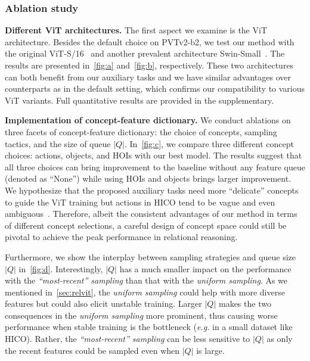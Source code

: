 \documentclass{article} \usepackage{iclr2022_conference,times}
\renewcommand{\paragraph}[1]{\noindent\textbf{#1.}}
\begin{document}
\vspace{-8pt}
\subsubsection{Ablation study}
\label{sec:exp_abl_rcl}
\vspace{-3pt}

\paragraph{Different ViT architectures}
The first aspect we examine is the ViT architecture. Besides the default choice on PVTv2-b2, we test our method with the original ViT-S/16~\citep{vit} and another prevalent architecture Swin-Small~\citep{liu2021swin}. The results are presented in~\autoref{fig:a} and~\autoref{fig:b}, respectively. These two architectures can both benefit from our auxiliary tasks and we have similar advantages over counterparts as in the default setting, which confirms our compatibility to various ViT variants. Full quantitative results are provided in the supplementary.

\paragraph{Implementation of concept-feature dictionary}
We conduct ablations on three facets of concept-feature dictionary: the choice of concepts, sampling tactics, and the size of queue $|Q|$. In~\autoref{fig:c}, we compare three different concept choices: actions, objects, and HOIs with our best model. The results suggest that all three choices can bring improvement to the baseline without any feature queue (denoted as ``None'') while using HOIs and objects brings larger improvement. We hypothesize that the proposed auxiliary tasks need more ``delicate'' concepts to guide the ViT training but actions in HICO tend to be vague and even ambiguous~\citep{zeroshothoi}. Therefore, albeit the consistent advantages of our method in terms of different concept selections, a careful design of concept space could still be pivotal to achieve the peak performance in relational reasoning. 

Furthermore, we show the interplay between sampling strategies and queue size $|Q|$ in~\autoref{fig:d}. Interestingly, $|Q|$ has a much smaller impact on the performance with the \textit{``most-recent'' sampling} than that with the \textit{uniform sampling}. As we mentioned in~\autoref{sec:relvit}, the \textit{uniform sampling} could help with more diverse features but could also elicit unstable training. Larger $|Q|$ makes the two consequences in the \textit{uniform sampling} more prominent, thus causing worse performance when stable training is the bottleneck (\emph{e.g.} in a small dataset like HICO). Rather, the \textit{``most-recent'' sampling} can be less sensitive to $|Q|$ as only the recent features could be sampled even when $|Q|$ is large.
\end{document}
